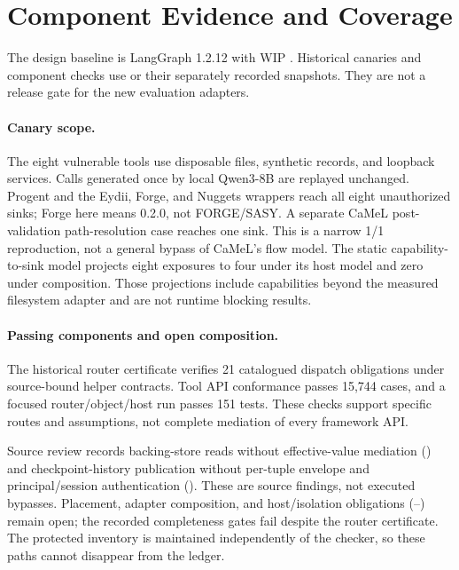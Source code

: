 \section{Component Evidence and Coverage}
\label{app:component-evidence}

The design baseline is LangGraph 1.2.12 with WIP . Historical
canaries and component checks use  or their separately recorded
snapshots. They are not a release gate for the new evaluation adapters.

\paragraph{Canary scope.}
The eight vulnerable tools use disposable files, synthetic records, and loopback
services. Calls generated once by local Qwen3-8B are replayed unchanged.
Progent and the Eydii, Forge, and Nuggets wrappers reach all eight unauthorized
sinks; Forge here means  0.2.0, not FORGE/SASY.
A separate CaMeL post-validation path-resolution case reaches one sink. This is
a narrow 1/1 reproduction, not a general bypass of CaMeL's flow model.
The static capability-to-sink model projects eight exposures to four under its
host model and zero under composition. Those projections include capabilities
beyond the measured filesystem adapter and are not runtime blocking results.

\paragraph{Passing components and open composition.}
The historical router certificate verifies 21 catalogued dispatch obligations
under source-bound helper contracts. Tool API conformance passes 15,744 cases,
and a focused router/object/host run passes 151 tests. These checks support
specific routes and assumptions, not complete mediation of every framework API.

Source review records backing-store reads without effective-value mediation
() and checkpoint-history publication without per-tuple envelope
and principal/session authentication (). These are source findings,
not executed bypasses. Placement, adapter composition, and host/isolation
obligations (--) remain open; the recorded completeness
gates fail despite the router certificate. The protected inventory is maintained
independently of the checker, so these paths cannot disappear from the ledger.

